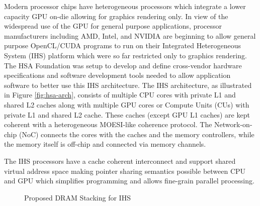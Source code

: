 \par Modern processor chips have heterogeneous processors which integrate a lower capacity GPU on-die allowing for graphics rendering only. In view of the widespread use of the GPU for general purpose applications, processor manufacturers including AMD\cite{amd-apu}, Intel\cite{inteliris}, and NVIDIA\cite{denver} are beginning to allow general purpose OpenCL\cite{opencl}/CUDA\cite{cuda} programs to run on their Integrated Heterogeneous System (IHS) platform which were so far restricted only to graphics rendering. The HSA Foundation \cite{hsafoundation} was setup to develop and define cross-vendor hardware specifications and software development tools needed to allow application software to better use this IHS architecture. 
The IHS architecture, as illustrated in Figure \ref{fig:hsa-arch}, consists of multiple CPU cores with private L1 and shared L2 caches along with multiple GPU cores or Compute Units (CUs) with private L1 and shared L2 cache. These caches (except GPU L1 caches) are kept coherent with a heterogeneous MOESI-like coherence protocol. The Network-on-chip (NoC) connects the cores with the caches and the memory controllers, while the memory itself is off-chip and connected via memory channels. 
\par The IHS processors have a cache coherent interconnect and support shared virtual address space making pointer sharing semantics possible between CPU and GPU which simplifies programming and allows fine-grain parallel processing.

\begin{figure}[!htb]
    \centering
    \def\svgwidth{\columnwidth}
    
    \caption{Proposed DRAM Stacking for IHS}
    \label{fig:stackdram}
\end{figure}

